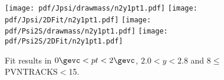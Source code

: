 \begin{figure}[H]
\begin{center}
\texttt{[image: pdf/Jpsi/drawmass/n2y1pt1.pdf]}
\texttt{[image: pdf/Jpsi/2DFit/n2y1pt1.pdf]}
\vspace*{-0.5cm}
\texttt{[image: pdf/Psi2S/drawmass/n2y1pt1.pdf]}
\texttt{[image: pdf/Psi2S/2DFit/n2y1pt1.pdf]}
\vspace*{-0.5cm}
\end{center}
\caption{Fit results in $0\gevc<pt<2\gevc$, $2.0<y<2.8$ and 8$\leq$PVNTRACKS$<$15.}
\label{Fitn2y1pt1}
\end{figure}
